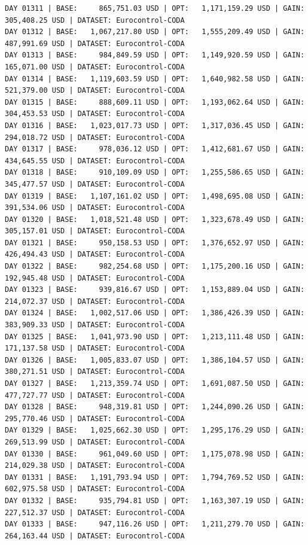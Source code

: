 \documentclass[11pt,a4paper]{article}
\begin{document}
\begin{verbatim}
DAY 01311 | BASE:     865,751.03 USD | OPT:   1,171,159.29 USD | GAIN: 305,408.25 USD | DATASET: Eurocontrol-CODA
DAY 01312 | BASE:   1,067,217.80 USD | OPT:   1,555,209.49 USD | GAIN: 487,991.69 USD | DATASET: Eurocontrol-CODA
DAY 01313 | BASE:     984,849.59 USD | OPT:   1,149,920.59 USD | GAIN: 165,071.00 USD | DATASET: Eurocontrol-CODA
DAY 01314 | BASE:   1,119,603.59 USD | OPT:   1,640,982.58 USD | GAIN: 521,379.00 USD | DATASET: Eurocontrol-CODA
DAY 01315 | BASE:     888,609.11 USD | OPT:   1,193,062.64 USD | GAIN: 304,453.53 USD | DATASET: Eurocontrol-CODA
DAY 01316 | BASE:   1,023,017.73 USD | OPT:   1,317,036.45 USD | GAIN: 294,018.72 USD | DATASET: Eurocontrol-CODA
DAY 01317 | BASE:     978,036.12 USD | OPT:   1,412,681.67 USD | GAIN: 434,645.55 USD | DATASET: Eurocontrol-CODA
DAY 01318 | BASE:     910,109.09 USD | OPT:   1,255,586.65 USD | GAIN: 345,477.57 USD | DATASET: Eurocontrol-CODA
DAY 01319 | BASE:   1,107,161.02 USD | OPT:   1,498,695.08 USD | GAIN: 391,534.06 USD | DATASET: Eurocontrol-CODA
DAY 01320 | BASE:   1,018,521.48 USD | OPT:   1,323,678.49 USD | GAIN: 305,157.01 USD | DATASET: Eurocontrol-CODA
DAY 01321 | BASE:     950,158.53 USD | OPT:   1,376,652.97 USD | GAIN: 426,494.43 USD | DATASET: Eurocontrol-CODA
DAY 01322 | BASE:     982,254.68 USD | OPT:   1,175,200.16 USD | GAIN: 192,945.48 USD | DATASET: Eurocontrol-CODA
DAY 01323 | BASE:     939,816.67 USD | OPT:   1,153,889.04 USD | GAIN: 214,072.37 USD | DATASET: Eurocontrol-CODA
DAY 01324 | BASE:   1,002,517.06 USD | OPT:   1,386,426.39 USD | GAIN: 383,909.33 USD | DATASET: Eurocontrol-CODA
DAY 01325 | BASE:   1,041,973.90 USD | OPT:   1,213,111.48 USD | GAIN: 171,137.58 USD | DATASET: Eurocontrol-CODA
DAY 01326 | BASE:   1,005,833.07 USD | OPT:   1,386,104.57 USD | GAIN: 380,271.51 USD | DATASET: Eurocontrol-CODA
DAY 01327 | BASE:   1,213,359.74 USD | OPT:   1,691,087.50 USD | GAIN: 477,727.77 USD | DATASET: Eurocontrol-CODA
DAY 01328 | BASE:     948,319.81 USD | OPT:   1,244,090.26 USD | GAIN: 295,770.46 USD | DATASET: Eurocontrol-CODA
DAY 01329 | BASE:   1,025,662.30 USD | OPT:   1,295,176.29 USD | GAIN: 269,513.99 USD | DATASET: Eurocontrol-CODA
DAY 01330 | BASE:     961,049.60 USD | OPT:   1,175,078.98 USD | GAIN: 214,029.38 USD | DATASET: Eurocontrol-CODA
DAY 01331 | BASE:   1,191,793.94 USD | OPT:   1,794,769.52 USD | GAIN: 602,975.58 USD | DATASET: Eurocontrol-CODA
DAY 01332 | BASE:     935,794.81 USD | OPT:   1,163,307.19 USD | GAIN: 227,512.37 USD | DATASET: Eurocontrol-CODA
DAY 01333 | BASE:     947,116.26 USD | OPT:   1,211,279.70 USD | GAIN: 264,163.44 USD | DATASET: Eurocontrol-CODA

\end{verbatim}
\end{document}
